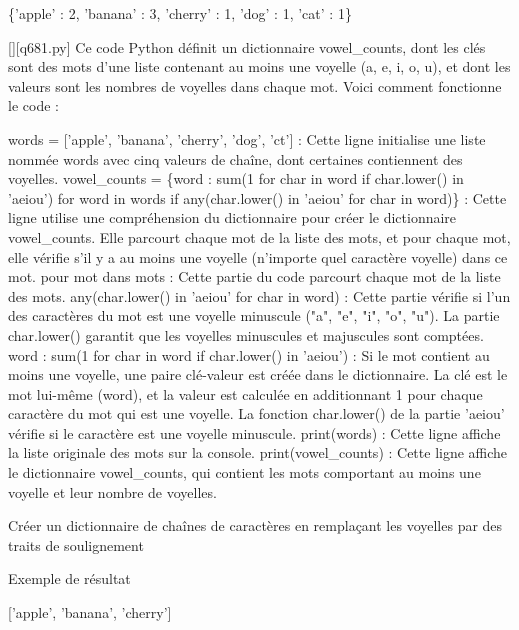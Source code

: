 \{'apple' : 2, 'banana' : 3, 'cherry' : 1, 'dog' : 1, 'cat' : 1\}
        \par
        \begin{solution}
            \renewcommand{\nomfichier}{q681.py}
            \pythonfile{\chemincode \nomfichier}[][\nomfichier]
            Ce code Python définit un dictionnaire vowel\_counts, dont les clés sont des mots d'une liste contenant au moins une voyelle (a, e, i, o, u), et dont les valeurs sont les nombres de voyelles dans chaque mot. Voici comment fonctionne le code :

    words = ['apple', 'banana', 'cherry', 'dog', 'ct'] : Cette ligne initialise une liste nommée words avec cinq valeurs de chaîne, dont certaines contiennent des voyelles.
    vowel\_counts = \{word : sum(1 for char in word if char.lower() in 'aeiou') for word in words if any(char.lower() in 'aeiou' for char in word)\} : Cette ligne utilise une compréhension du dictionnaire pour créer le dictionnaire vowel\_counts. Elle parcourt chaque mot de la liste des mots, et pour chaque mot, elle vérifie s'il y a au moins une voyelle (n'importe quel caractère voyelle) dans ce mot.
        pour mot dans mots : Cette partie du code parcourt chaque mot de la liste des mots.
        any(char.lower() in 'aeiou' for char in word) : Cette partie vérifie si l'un des caractères du mot est une voyelle minuscule ("a", "e", "i", "o", "u"). La partie char.lower() garantit que les voyelles minuscules et majuscules sont comptées.
        word : sum(1 for char in word if char.lower() in 'aeiou') : Si le mot contient au moins une voyelle, une paire clé-valeur est créée dans le dictionnaire. La clé est le mot lui-même (word), et la valeur est calculée en additionnant 1 pour chaque caractère du mot qui est une voyelle. La fonction char.lower() de la partie 'aeiou' vérifie si le caractère est une voyelle minuscule.
    print(words) : Cette ligne affiche la liste originale des mots sur la console.
    print(vowel\_counts) : Cette ligne affiche le dictionnaire vowel\_counts, qui contient les mots comportant au moins une voyelle et leur nombre de voyelles.
        \end{solution}
        

        \question
        Créer un dictionnaire de chaînes de caractères en remplaçant les voyelles par des traits de soulignement

Exemple de résultat

['apple', 'banana', 'cherry']

